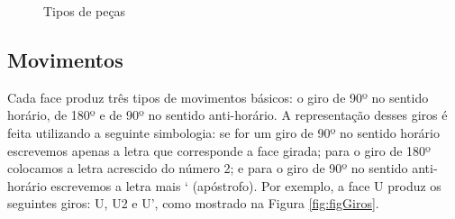 \begin{figure}[!htb]
    \centering
    \quad %
    \quad %
\caption{Tipos de peças}
\label{fig:figPecas}
\end{figure}


\subsection{Movimentos} 
Cada face produz três tipos de movimentos básicos: o giro de 90º no sentido horário, de 180º e de 90º no sentido anti-horário. A representação desses giros é feita utilizando a seguinte simbologia: se for um giro de 90º no sentido horário escrevemos apenas a letra que corresponde a face girada; para o giro de 180º colocamos a letra acrescido do número 2; e para o giro de 90º no sentido anti-horário escrevemos a letra mais ‘ (apóstrofo). Por exemplo, a face U produz os seguintes giros: U, U2 e U’, como mostrado na Figura \ref{fig:figGiros}.


